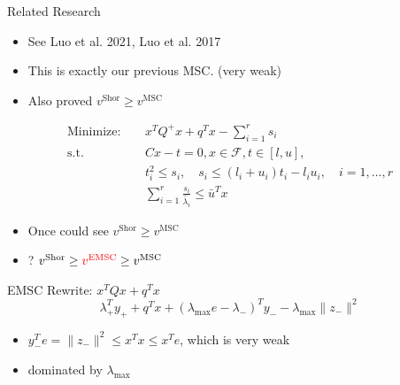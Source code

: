 \begin{frame}{Related Research}

  \begin{itemize}
    \item See Luo et al. 2021, Luo et al. 2017
    \item This is exactly our previous MSC. (very weak)
    \item Also proved \(v^{\mathrm{Shor}} \ge v^{\mathrm{MSC}}\)
  \end{itemize}
  \begin{align*}
    \mathrm{Minimize: }\quad & x^{T} Q^{+} x+q^{T} x-\sum_{i=1}^{r} s_{i}                                                             \\
    \mathrm{s.t.}     \quad  & C x-t=0, x \in \mathcal{F}, t \in[l, u],                                                               \\
                             & t_{i}^{2} \leq s_{i}, \quad s_{i} \leq\left(l_{i}+u_{i}\right) t_{i}-l_{i} u_{i}, \quad i=1, \ldots, r \\
                             & \sum_{i=1}^{r} \frac{s_{i}}{\hat{\lambda}_{i}} \leq \bar{u}^{T} x
  \end{align*}

  \begin{itemize}
    \item Once could see \(v^{\mathrm{Shor}} \ge v^{\mathrm{MSC}}\)
    \item ? \(v^{\mathrm{Shor}} \ge \textcolor{red}{v^{\mathrm{EMSC}}}\ge v^{\mathrm{MSC}}\)
  \end{itemize}
\end{frame}



\begin{frame}{EMSC}
  Rewrite:  \(x^TQx + q^T x  \)
  \[\lambda_+ ^T y_+ + q^Tx + (\lambda_{\max} e - \lambda_-)^T y_- - \lambda_{\max} \|z_-\|^2  \]

  \begin{itemize}
    \item \(y_-^Te= \|z_-\|^2 \le x^Tx \le x^Te \), which is very weak
    \item dominated by \(\lambda_{\max}\)
  \end{itemize}
\end{frame}

